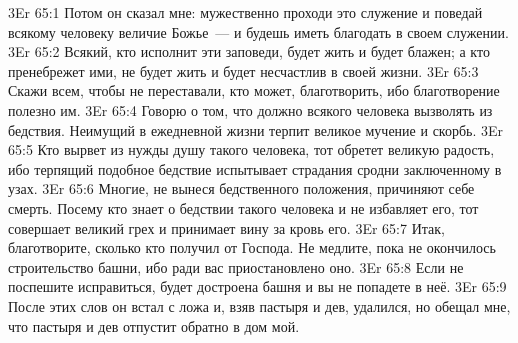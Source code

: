 \vs 3Er 65:1
Потом он сказал мне:
мужественно проходи это служение и поведай всякому человеку величие Божье~--- и
будешь иметь благодать в своем служении.
\vs 3Er 65:2
Всякий, кто исполнит эти
заповеди, будет жить и будет блажен; а кто пренебрежет ими, не будет жить и
будет несчастлив в своей жизни.
\vs 3Er 65:3
Скажи всем, чтобы не
переставали, кто может, благотворить, ибо благотворение полезно им.
\vs 3Er 65:4
Говорю о том, что должно
всякого человека вызволять из бедствия. Неимущий в ежедневной жизни терпит
великое мучение и скорбь.
\vs 3Er 65:5
Кто вырвет из нужды душу
такого человека, тот обретет великую радость, ибо терпящий подобное бедствие
испытывает страдания сродни заключенному в узах.
\vs 3Er 65:6
Многие, не вынеся
бедственного положения, причиняют себе смерть. Посему кто знает о бедствии
такого человека и не избавляет его, тот совершает великий грех и принимает
вину за кровь его.
\vs 3Er 65:7
Итак, благотворите,
сколько кто получил от Господа. Не медлите, пока не окончилось строительство
башни, ибо ради вас приостановлено оно.
\vs 3Er 65:8
Если не поспешите
исправиться, будет достроена башня и вы не попадете в неё.
\vs 3Er 65:9
После этих слов он встал с
ложа и, взяв пастыря и дев, удалился, но обещал мне, что пастыря и дев
отпустит обратно в дом мой.
